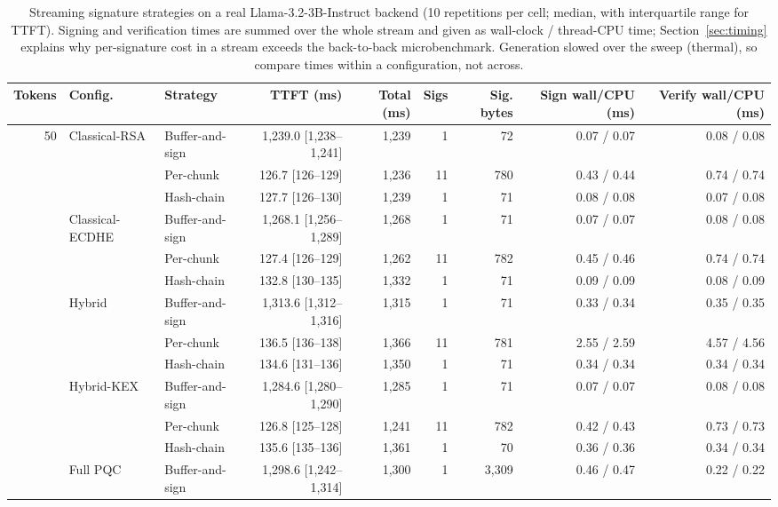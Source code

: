\begin{table}[t]
\centering
\caption{Streaming signature strategies on a real Llama-3.2-3B-Instruct backend (10 repetitions per cell; median, with interquartile range for TTFT). Signing and verification times are summed over the whole stream and given as wall-clock / thread-CPU time; Section~\ref{sec:timing} explains why per-signature cost in a stream exceeds the back-to-back microbenchmark. Generation slowed over the sweep (thermal), so compare times within a configuration, not across.}
\label{tab:streaming}
\setlength{\tabcolsep}{2.4pt}
\footnotesize
\begin{tabular}{@{}rllrrrrrr@{}}
\toprule
Tokens & Config. & Strategy & TTFT (ms) & Total (ms) & Sigs & Sig. bytes & Sign wall/CPU (ms) & Verify wall/CPU (ms) \\
\midrule
50 & Classical-RSA & Buffer-and-sign & 1,239.0 [1,238--1,241] & 1,239 & 1 & 72 & 0.07 / 0.07 & 0.08 / 0.08 \\
 &  & Per-chunk & 126.7 [126--129] & 1,236 & 11 & 780 & 0.43 / 0.44 & 0.74 / 0.74 \\
 &  & Hash-chain & 127.7 [126--130] & 1,239 & 1 & 71 & 0.08 / 0.08 & 0.07 / 0.08 \\
\addlinespace[1pt]
 & Classical-ECDHE & Buffer-and-sign & 1,268.1 [1,256--1,289] & 1,268 & 1 & 71 & 0.07 / 0.07 & 0.08 / 0.08 \\
 &  & Per-chunk & 127.4 [126--129] & 1,262 & 11 & 782 & 0.45 / 0.46 & 0.74 / 0.74 \\
 &  & Hash-chain & 132.8 [130--135] & 1,332 & 1 & 71 & 0.09 / 0.09 & 0.08 / 0.09 \\
\addlinespace[1pt]
 & Hybrid & Buffer-and-sign & 1,313.6 [1,312--1,316] & 1,315 & 1 & 71 & 0.33 / 0.34 & 0.35 / 0.35 \\
 &  & Per-chunk & 136.5 [136--138] & 1,366 & 11 & 781 & 2.55 / 2.59 & 4.57 / 4.56 \\
 &  & Hash-chain & 134.6 [131--136] & 1,350 & 1 & 71 & 0.34 / 0.34 & 0.34 / 0.34 \\
\addlinespace[1pt]
 & Hybrid-KEX & Buffer-and-sign & 1,284.6 [1,280--1,290] & 1,285 & 1 & 71 & 0.07 / 0.07 & 0.08 / 0.08 \\
 &  & Per-chunk & 126.8 [125--128] & 1,241 & 11 & 782 & 0.42 / 0.43 & 0.73 / 0.73 \\
 &  & Hash-chain & 135.6 [135--136] & 1,361 & 1 & 70 & 0.36 / 0.36 & 0.34 / 0.34 \\
\addlinespace[1pt]
 & Full PQC & Buffer-and-sign & 1,298.6 [1,242--1,314] & 1,300 & 1 & 3,309 & 0.46 / 0.47 & 0.22 / 0.22 \\

\end{tabular}
\end{table}
